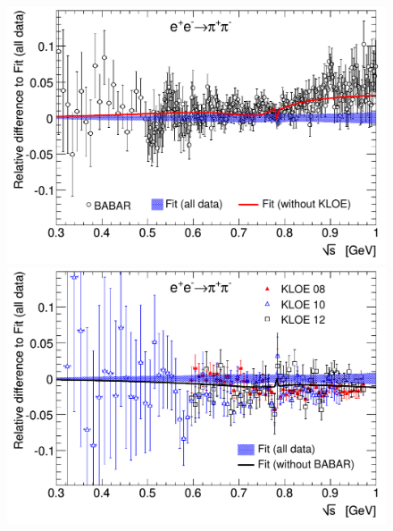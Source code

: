 \begin{figure}[t]
\begin{center}
\includegraphics[width=\figsize]{Figures/ff2_fit_babar_dhmz19.pdf}\hspace{\fighspace}
\includegraphics[width=\figsize]{Figures/ff2_fit_kloe_dhmz19.pdf}
\vspace{0.2cm}


\end{center}
\end{figure}
